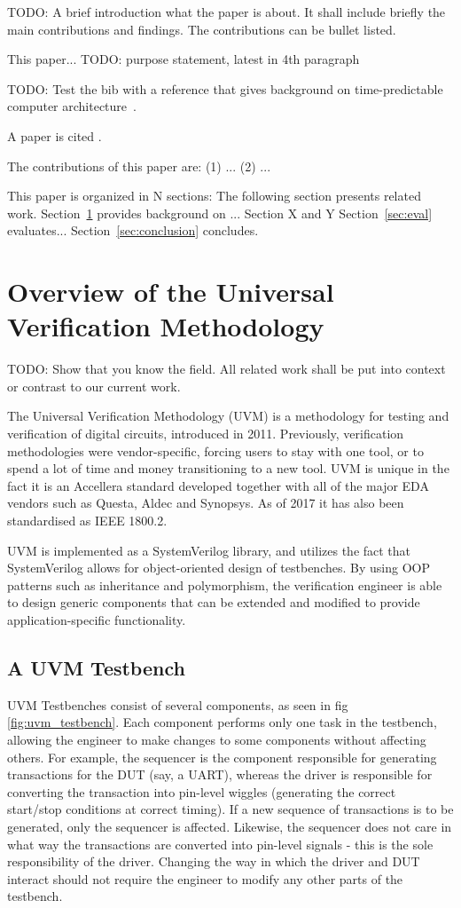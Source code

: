 \documentclass[a4paper, conference]{IEEEtran}
\newcommand{\todo}[1]{{\color{olive} TODO: #1}}
\begin{document}
\todo{A brief introduction what the paper is about. It shall include briefly the
main contributions and findings. The contributions can be bullet listed.}

This paper... \todo{purpose statement, latest in 4th paragraph}

\todo{Test the bib with a reference that gives background on time-predictable
computer architecture~\cite{tpca:jes}.}

A paper is cited \cite{paper:example}.

The contributions of this paper are: (1) ... (2) ...

This paper is organized in N sections: The following section presents related work.
Section~\ref{sec:related} provides background on ...
Section X and Y 
Section~\ref{sec:eval} evaluates...
Section~\ref{sec:conclusion} concludes.


\section{Overview of the Universal Verification Methodology}
\label{sec:related}

\todo{Show that you know the field. All related work shall be put
into context or contrast to our current work.}

The Universal Verification Methodology (UVM) is a methodology for testing and verification of digital circuits, introduced in 2011. Previously, verification methodologies were vendor-specific, forcing users to stay with one tool, or to spend a lot of time and money transitioning to a new tool. UVM is unique in the fact it is an Accellera standard developed together with all of the major EDA vendors such as Questa, Aldec and Synopsys. As of 2017 it has also been standardised as IEEE 1800.2.

UVM is implemented as a SystemVerilog library, and utilizes the fact that SystemVerilog allows for object-oriented design of testbenches. By using OOP patterns such as inheritance and polymorphism, the verification engineer is able to design generic components that can be extended and modified to provide application-specific functionality. 

\subsection{A UVM Testbench}
UVM Testbenches consist of several components, as seen in fig \ref{fig:uvm_testbench}. Each component performs only one task in the testbench, allowing the engineer to make changes to some components without affecting others. 
For example, the sequencer is the component responsible for generating transactions for the DUT (say, a UART), whereas the driver is responsible for converting the transaction into pin-level wiggles (generating the correct start/stop conditions at correct timing). If a new sequence of transactions is to be generated, only the sequencer is affected. Likewise, the sequencer does not care in what way the transactions are converted into pin-level signals - this is the sole responsibility of the driver. Changing the way in which the driver and DUT interact should not require the engineer to modify any other parts of the testbench.
\end{document}
